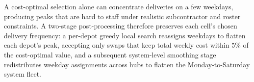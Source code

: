 \documentclass[3p,times,procedia]{elsarticle}
\begin{document}
A cost-optimal selection alone can concentrate deliveries on a few weekdays, producing peaks that are hard to staff under realistic subcontractor and roster constraints. A two-stage post-processing therefore preserves each cell's chosen delivery frequency: a per-depot greedy local search reassigns weekdays to flatten each depot's peak, accepting only swaps that keep total weekly cost within $5\%$ of the cost-optimal value, and a subsequent system-level smoothing stage redistributes weekday assignments across hubs to flatten the Monday-to-Saturday system fleet.














\end{document}
